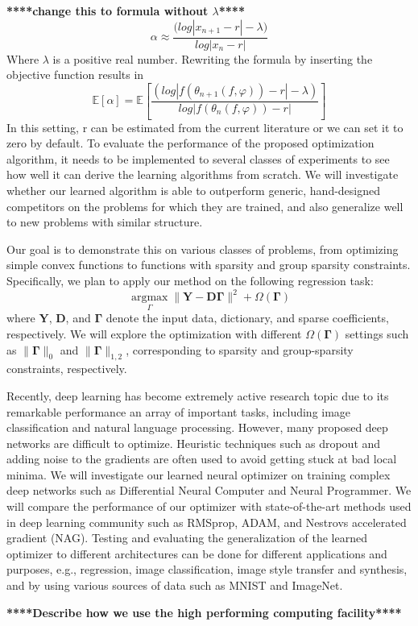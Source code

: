 \documentclass[a4paper, 11pt]{article}
\begin{document}
\textbf{****change this to formula without $\lambda$****}
$$\alpha\approx\frac{(log{|x_{n+1}-r|-\lambda)}}{log{|x_n-r|}}$$ 
Where $\lambda$ is a positive real number. Rewriting the formula by inserting the objective function results in
$$\mathbb{E}[\alpha]=\mathbb{E}\left[\frac{(log|f(\theta_{n+1}(f,\varphi))-r|-\lambda)}{log|f(\theta_n (f,\varphi))-r|}\right]$$
In this setting, r can be estimated from the current literature or we can set it to zero by default. 
To evaluate the performance of the proposed optimization algorithm, it needs to be implemented to several classes of experiments to see how well it can derive the learning algorithms from scratch. We will investigate whether our learned algorithm is able to outperform generic, hand-designed competitors on the problems for which they are trained, and also generalize well to new problems with similar structure. 

Our goal is to demonstrate this on various classes of problems, from optimizing simple convex functions to functions with sparsity and group sparsity constraints. Specifically, we plan to apply our method on the following regression task: 
$$\underset{\Gamma}{\operatorname{argmax}} \| \mathbf{Y} - \mathbf{D} \mathbf{\Gamma} \|^2 + \Omega (\mathbf{\Gamma})$$
where $\mathbf{Y}$, $\mathbf{D}$, and $\mathbf{\Gamma}$ denote the input data, dictionary, and sparse coefficients, respectively. We will explore the optimization with different $\Omega (\mathbf{\Gamma})$ settings such as $\|\mathbf{\Gamma}\|_0$ and $\|\mathbf{\Gamma}\|_{1,2}$, corresponding to sparsity and group-sparsity constraints, respectively.

Recently, deep learning has become extremely active research topic due to its remarkable performance an array of important tasks, including image classification and natural language processing. However, many proposed deep networks are difficult to optimize. Heuristic techniques such as dropout and adding noise to the gradients are often used to avoid getting stuck at bad local minima. We will investigate our learned neural optimizer on training complex deep networks such as Differential Neural Computer and Neural Programmer. We will compare the performance of our optimizer with state-of-the-art methods used in deep learning community such as RMSprop, ADAM, and Nestrov\textsc{}s accelerated gradient (NAG). Testing and evaluating the generalization of the learned optimizer to different architectures can be done for different applications and purposes, e.g., regression, image classification, image style transfer and synthesis, and by using various sources of data such as MNIST and ImageNet. 

\textbf{****Describe how we use the high performing computing facility****}
\end{document}
